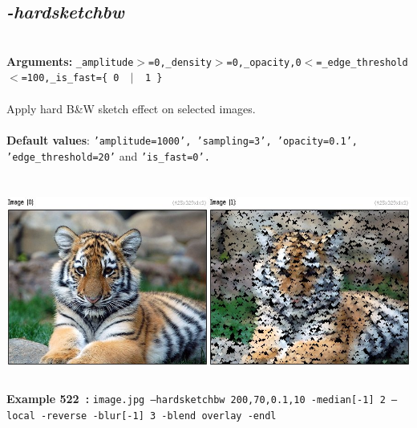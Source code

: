\documentclass[a4paper,11pt,twoside]{book}
\begin{document}
\subsection{\emph{-hardsketchbw} }\vspace*{-0.5em}
~\\\textbf{Arguments: } 
{\small \texttt{\_amplitude$>$=0,\_density$>$=0,\_opacity,0$<$=\_edge\_threshold$<$=100,\_is\_fast=\{ 0 ~$|$~ 1 \}}}\\~\\
Apply hard B\&W sketch effect on selected images.
~\\~\\\textbf{Default values}: {\small \texttt{'amplitude=1000', 'sampling=3', 'opacity=0.1', 'edge\_threshold=20'} and \texttt{'is\_fast=0'.}}
\begin{center}\includegraphics[keepaspectratio=true,height=7cm,width=\textwidth]{img/gmic_def522.jpg}\\
{\footnotesize \textbf{Example 522~:} \texttt{image.jpg --hardsketchbw 200,70,0.1,10 -median[-1] 2 --local -reverse -blur[-1] 3 -blend overlay -endl}}
\end{center}
\end{document}
